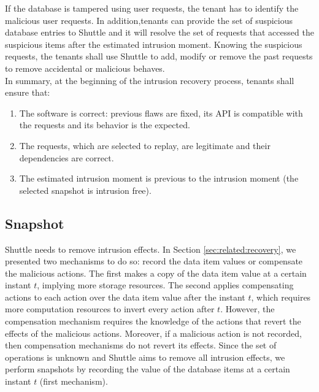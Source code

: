 If the database is tampered using user requests, the tenant has to identify the malicious user requests. In addition,tenants can provide the set of suspicious database entries to Shuttle and it will resolve the set of requests that accessed the suspicious items after the estimated intrusion moment. Knowing the suspicious requests, the tenants shall use Shuttle to add, modify or remove the past requests to remove accidental or malicious behaves. \\

In summary, at the beginning of the intrusion recovery process, tenants shall ensure that:
\begin{enumerate}
    \item The software is correct: previous flaws are fixed, its \ac{API} is compatible with the requests and its behavior is the expected.
    \item The requests, which are selected to replay, are legitimate and their dependencies are correct.
    \item The estimated intrusion moment is previous to the intrusion moment (the selected snapshot is intrusion free).
\end{enumerate} 


\subsection{Snapshot}
\label{sec:arch:snapshot}

Shuttle needs to remove intrusion effects. In Section \ref{sec:related:recovery}, we presented two mechanisms to do so: record the data item values or compensate the malicious actions. The first makes a copy of the data item value at a certain instant $t$, implying more storage resources. The second applies compensating actions to each action over the data item value after the instant $t$, which requires more computation resources to invert every action after $t$. However, the compensation mechanism requires the knowledge of the actions that revert the effects of the malicious actions. Moreover, if a malicious action is not recorded, then compensation mechanisms do not revert its effects. Since the set of operations is unknown and Shuttle aims to remove all intrusion effects, we perform snapshots by recording the value of the database items at a certain instant $t$ (first mechanism).\\

